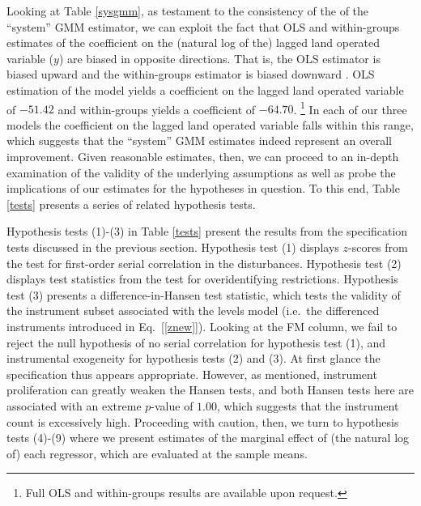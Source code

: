 \documentclass[english]{article}
\begin{document}
 Looking at Table \ref{sysgmm}, as testament to the consistency of the
 of the ``system'' GMM estimator, we can exploit the fact that OLS and 
 within-groups estimates of the coefficient on the (natural log of the) lagged 
 land operated variable ($y$) are biased in opposite directions. 
 That is, the OLS estimator is biased upward and the within-groups estimator
 is biased downward \citep{bond2002}.
 OLS estimation of the model yields a coefficient on the lagged land operated 
 variable of $-51.42$ and within-groups yields a coefficient of $-64.70$.%
 \footnote{Full OLS and within-groups results are available upon request.}
 In each of our three models the coefficient on the lagged land operated 
 variable falls within this range, which suggests that the ``system'' GMM 
 estimates indeed represent an overall improvement.
 Given reasonable estimates, then, we can proceed to an in-depth 
 examination of the validity of the underlying assumptions as well as probe
 the implications of our estimates for the hypotheses in question.
 To this end, Table \ref{tests} presents a series of related hypothesis tests.
 
Hypothesis tests (1)-(3) in Table \ref{tests} present the results from the 
specification tests discussed in the previous section. 
Hypothesis test (1) displays $z$-scores from the \citet{arellano1991} test 
for first-order serial correlation in the disturbances.
Hypothesis test (2) displays test statistics from the \citet{hansen1982} 
test for overidentifying restrictions.
Hypothesis test (3) presents a difference-in-Hansen test statistic, which 
tests the validity of the instrument subset associated with the levels model
(i.e.\ the differenced instruments introduced in Eq.\ [\ref{znew}]).
Looking at the FM column, we fail to reject the null hypothesis of no 
serial correlation for hypothesis test (1), and instrumental exogeneity for 
hypothesis tests (2) and (3).
At first glance the specification thus appears appropriate.
However, as mentioned, instrument proliferation can greatly weaken the 
Hansen tests, and both Hansen tests here are associated with an extreme 
$p$-value of $1.00$, which suggests that the instrument count is excessively 
high. 
Proceeding with caution, then, we turn to hypothesis tests (4)-(9) where we 
present estimates of the marginal effect of (the natural log of) each regressor, 
which are evaluated at the sample means.
\end{document}
